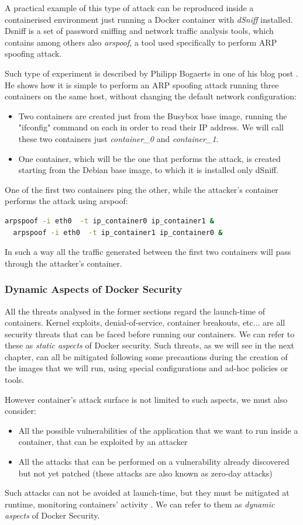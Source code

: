 \documentclass[a4paper,12pt]{article}
\begin{document}
A practical example of this type of attack can be reproduced inside a
containerised environment just running a Docker container with \textit{dSniff}
installed. Dsniff is a set of password sniffing and network traffic analysis
tools, which contains among others also \textit{arspoof}, a tool used
specifically to perform ARP spoofing attack\cite{wiki_dsniff}. \par Such type of
experiment is described by Philipp Bogaerts in one of his blog post
\cite{bogaerts_arpspoof}. He shows how it is simple to perform an ARP spoofing
attack running three containers on the same host, without changing the default
network configuration:
\begin{itemize}
  \item Two containers are created just from the Busybox base image, running the
  "ifconfig" command on each in order to read their IP address. We will call
  these two containers just \textit{container\_0} and \textit{container\_1}.
  \item One container, which will be the one that performs the attack, is created
  starting from the Debian base image, to which it is installed only dSniff. 
\end{itemize}
One of the first two containers ping the other, while the attacker's container
performs the attack using arspoof:
\begin{lstlisting}[language=bash,breaklines]
  arpspoof -i eth0  -t ip_container0 ip_container1 &
  arpspoof -i eth0  -t ip_container1 ip_container0 &
\end{lstlisting}
In such a way all the traffic generated between the first two containers will
pass through the attacker's container.

\subsubsection{Dynamic Aspects of Docker Security}

All the threats analysed in the former sections regard the launch-time of
containers. Kernel exploits, denial-of-service, container breakouts, etc... are
all security threats that can be faced before running our containers. We can
refer to these as \textit{static aspects} of Docker security. Such threats, as
we will see in the next chapter, can all be mitigated following some precautions
during the creation of the images that we will run, using special configurations
and ad-hoc policies or tools.\par However container's attack surface is not
limited to such aspects, we must also consider:
\begin{itemize}
  \item All the possible vulnerabilities of the application that we want to run
  inside a container, that can be exploited by an attacker
  \item All the attacks that can be performed on a vulnerability already
  discovered but not yet patched (these attacks are also known as zero-day
  attacks)
\end{itemize}
Such attacks can not be avoided at launch-time, but they must be mitigated at
runtime, monitoring containers' activity . We can refer to them as
\textit{dynamic aspects} of Docker Security. 
\end{document}
